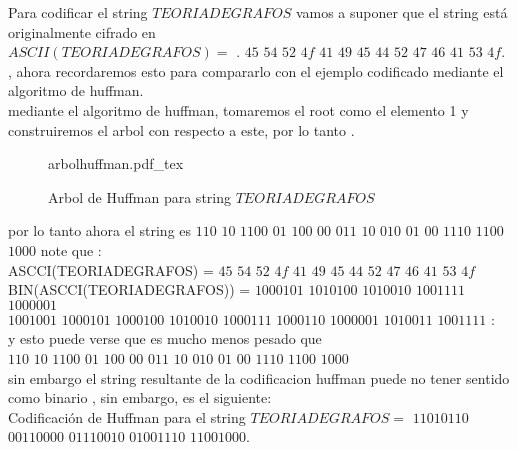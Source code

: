 \documentclass[10pt,a4paper]{article} %
\newcommand{\incfig}[1]{%
    \def\svgwidth{\columnwidth}
    {#1.pdf_tex}
}
\begin{document}
        Para codificar el string $TEORIADEGRAFOS$ vamos a suponer que el string
        está originalmente cifrado en
        \\
        $ASCII(TEORIADEGRAFOS) = $ . $45$ $54$ $52$ $4f$ $41$ $49$ $45$ $44$
        $52$ $47$ $46$ $41$ $53$ $4f$.
        \\
        , ahora recordaremos esto para compararlo con el ejemplo codificado
        mediante el algoritmo de huffman.
        \\
        mediante el algoritmo de huffman, tomaremos el root como el elemento 1
        y construiremos el arbol con respecto a este, por lo tanto .
        \\
        \newpage
        \begin{figure}[ht]
            \centering
            \incfig{arbolhuffman}
            \caption{Arbol de Huffman para string $TEORIADEGRAFOS$}
            \label{fig:arbolhuffman}
        \end{figure}
        por lo tanto ahora el string es $110$ $10$ $1100$ $01$ $100$ $00$   $011$ $10$   $010$ $01$ $00$ $1110$  $1100$ $1000$
        note que :
        \\
        ASCCI(TEORIADEGRAFOS) = $45$ $54$ $52$ $4f$ $41$ $49$    $45$ $44$     $52$ $47$ $46$ $41$ $53$ $4f$
        \\
        BIN(ASCCI(TEORIADEGRAFOS)) = $1000101$ $1010100$ $1010010$ $1001111$ $1000001$
        \\
        $1001001$ $1000101$ $1000100$ $1010010$ $1000111$ $1000110$ $1000001$ $1010011$ $1001111$ :
        \\
        y esto puede verse que es mucho menos pesado que
        \\
        $110$ $10$ $1100$ $01$ $100$ $00$   $011$ $10$   $010$ $01$ $00$ $1110$  $1100$ $1000$
        \\
        sin embargo el string resultante de la codificacion huffman puede no tener sentido como binario , sin embargo, es el siguiente:
        \\
         Codificación de Huffman para el string $TEORIADEGRAFOS=$  $11010110$  $00110000$  $01110010$  $01001110$  $11001000$.













    \nocite{*}
    
    
\end{document}
